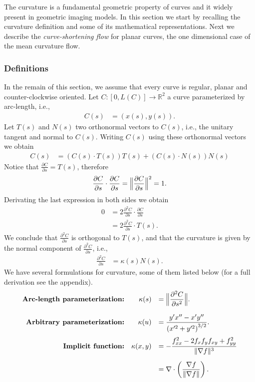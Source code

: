 The curvature is a fundamental geometric property of curves and it widely present in geometric imaging models. In this section we start by recalling the curvature definition and some of its mathematical representations. Next we describe the \emph{curve-shortening flow} for planar curves, the one dimensional case of the mean curvature flow.

\subsubsection{Definitions}
In the remain of this section, we assume that every curve is regular, planar and counter-clockwise oriented. Let $C:[0,L(C)]\rightarrow \mathbb{R}^2$ a curve parameterized by arc-length, i.e.,
\begin{align*}
	C(s) &= (x(s),y(s)).
\end{align*}
%
Let $T(s)$ and $N(s)$ two orthonormal vectors to $C(s)$, i.e., the unitary tangent and normal to $C(s)$. Writing $C(s)$ using these orthonormal vectors we obtain
\begin{align*}
	C(s) &= \left( C(s) \cdot T(s) \right)T(s) + \left( C(s) \cdot N(s) \right)N(s)
\end{align*}
%
Notice that $\frac{\partial C}{\partial s} = T(s)$, therefore
\begin{align*}
	\frac{\partial C}{\partial s} \cdot \frac{\partial C}{\partial s} = \Big\lVert \frac{ \partial C}{\partial s} \Big\rVert^2 = 1.
\end{align*}
%
Derivating the last expression in both sides we obtain
\begin{align*}
	0 &= 2\frac{\partial ^2 C}{\partial s} \cdot \frac{\partial C}{\partial s} \\
	  &= 2\frac{\partial ^2 C}{\partial s} \cdot T(s).
\end{align*}
%
We conclude that $\frac{\partial ^2 C}{\partial s}$ is orthogonal to $T(s)$, and that the curvature is given by the normal component of $\frac{\partial ^2 C}{\partial s}$, i.e.,
\begin{align*}
	\frac{\partial ^2 C}{\partial s} &= \kappa(s) N(s).
\end{align*}
%
We have several formulations for curvature, some of them listed below (for a full derivation see the appendix). 
\begin{align*}
\begin{array}{rrl}
	\textbf{Arc-length parameterization:} & \displaystyle \kappa(s) &= \displaystyle \Big\lVert \frac{\partial^2 C}{\partial s^2} \Big\rVert. \\[1.5em]	
	\textbf{Arbitrary parameterization:} & \displaystyle \kappa(u) &= \displaystyle \frac{y'x'' - x'y''}{\left( x'^2 + y'^2 \right)^{3/2}}. \\[1.5em]
	\textbf{Implicit function:} & \displaystyle \kappa(x,y) &= \displaystyle -\frac{f_{xx}^2 - 2f_xf_yf_{xy} + f_{yy}^2}{\lVert\nabla f\rVert^3} \\[1.5em]
	&&= \displaystyle \nabla \cdot \left( \frac{\nabla f}{\lVert\nabla f\rVert} \right).
\end{array}
\end{align*}
%
%
